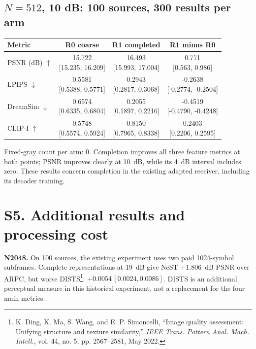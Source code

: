 \documentclass[11pt,letterpaper]{article}
\begin{document}
\subsection*{$N=512$, 10 dB: 100 sources, 300 results per arm}
\begin{center}\small\setlength{\tabcolsep}{7pt}\renewcommand{\arraystretch}{1.55}
\begin{tabular}{lccc}
\toprule
Metric & R0 coarse & R1 completed & R1 minus R0\\\midrule
PSNR (dB) $\uparrow$ & \shortstack{15.722\\{}[15.235, 16.209]} & \shortstack{16.493\\{}[15.993, 17.004]} & \shortstack{0.771\\{}[0.563, 0.986]}\\
LPIPS $\downarrow$ & \shortstack{0.5581\\{}[0.5388, 0.5771]} & \shortstack{0.2943\\{}[0.2817, 0.3068]} & \shortstack{-0.2638\\{}[-0.2774, -0.2504]}\\
DreamSim $\downarrow$ & \shortstack{0.6574\\{}[0.6335, 0.6804]} & \shortstack{0.2055\\{}[0.1897, 0.2216]} & \shortstack{-0.4519\\{}[-0.4790, -0.4248]}\\
CLIP-I $\uparrow$ & \shortstack{0.5748\\{}[0.5574, 0.5924]} & \shortstack{0.8150\\{}[0.7965, 0.8338]} & \shortstack{0.2403\\{}[0.2206, 0.2595]}\\
\bottomrule\end{tabular}\end{center}
Fixed-gray count per arm: 0.
Completion improves all three feature metrics at both points; PSNR improves clearly at 10~dB, while its 4~dB interval includes zero. These results concern completion in the existing adapted receiver, including its decoder training.

\clearpage\section*{S5. Additional results and processing cost}
\textbf{N2048.} On 100 sources, the existing experiment uses two paid 1024-symbol subframes. Complete representations at 19~dB give NeST $+1.806$~dB PSNR over ARPC, but worse DISTS\footnote{K. Ding, K. Ma, S. Wang, and E. P. Simoncelli, ``Image quality assessment: Unifying structure and texture similarity,'' \emph{IEEE Trans. Pattern Anal. Mach. Intell.}, vol. 44, no. 5, pp. 2567--2581, May 2022.}: $+0.0054\,[0.0024,0.0086]$. DISTS is an additional perceptual measure in this historical experiment, not a replacement for the four main metrics.
\end{document}
